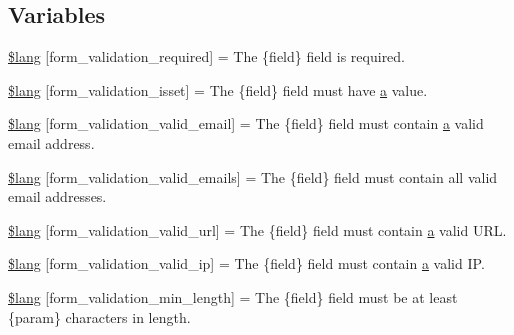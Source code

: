 \subsection*{Variables}
\begin{DoxyCompactItemize}
\item 
\hyperlink{form__validation__lang_8php_a2335c24e2213207c5dda58ec093673a9}{\$lang} \mbox{[}\textquotesingle{}form\+\_\+validation\+\_\+required\textquotesingle{}\mbox{]} = \textquotesingle{}The \{field\} field is required.\textquotesingle{}
\item 
\hyperlink{form__validation__lang_8php_a941575e651258a5a17341aca4e587898}{\$lang} \mbox{[}\textquotesingle{}form\+\_\+validation\+\_\+isset\textquotesingle{}\mbox{]} = \textquotesingle{}The \{field\} field must have \hyperlink{assets_2js_2bootstrap_8min_8js_a1f5870dcf487187f13d5fd328ed9e6e7}{a} value.\textquotesingle{}
\item 
\hyperlink{form__validation__lang_8php_a652d5be4d397dcac4407294c2436af34}{\$lang} \mbox{[}\textquotesingle{}form\+\_\+validation\+\_\+valid\+\_\+email\textquotesingle{}\mbox{]} = \textquotesingle{}The \{field\} field must contain \hyperlink{assets_2js_2bootstrap_8min_8js_a1f5870dcf487187f13d5fd328ed9e6e7}{a} valid email address.\textquotesingle{}
\item 
\hyperlink{form__validation__lang_8php_af9ec234a36f18a91c981985c3db4333e}{\$lang} \mbox{[}\textquotesingle{}form\+\_\+validation\+\_\+valid\+\_\+emails\textquotesingle{}\mbox{]} = \textquotesingle{}The \{field\} field must contain all valid email addresses.\textquotesingle{}
\item 
\hyperlink{form__validation__lang_8php_af9467e9ed3767f5bff205b79d706fe0a}{\$lang} \mbox{[}\textquotesingle{}form\+\_\+validation\+\_\+valid\+\_\+url\textquotesingle{}\mbox{]} = \textquotesingle{}The \{field\} field must contain \hyperlink{assets_2js_2bootstrap_8min_8js_a1f5870dcf487187f13d5fd328ed9e6e7}{a} valid U\+R\+L.\textquotesingle{}
\item 
\hyperlink{form__validation__lang_8php_a8d9bfb49825972af0deee31f8f9dccf2}{\$lang} \mbox{[}\textquotesingle{}form\+\_\+validation\+\_\+valid\+\_\+ip\textquotesingle{}\mbox{]} = \textquotesingle{}The \{field\} field must contain \hyperlink{assets_2js_2bootstrap_8min_8js_a1f5870dcf487187f13d5fd328ed9e6e7}{a} valid I\+P.\textquotesingle{}
\item 
\hyperlink{form__validation__lang_8php_a8af94ce29e8a4ac82c976c891b51ffc9}{\$lang} \mbox{[}\textquotesingle{}form\+\_\+validation\+\_\+min\+\_\+length\textquotesingle{}\mbox{]} = \textquotesingle{}The \{field\} field must be at least \{param\} characters in length.\textquotesingle{}

\end{DoxyCompactItemize}
